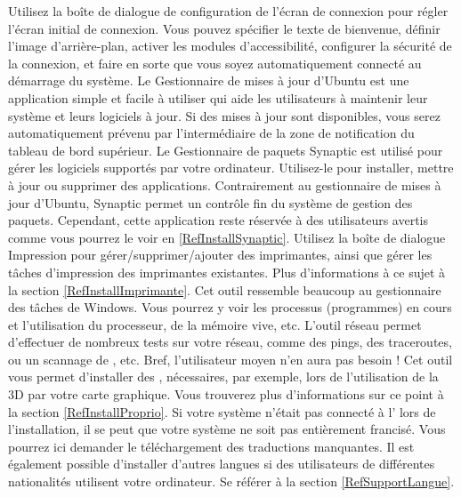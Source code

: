 Utilisez la boîte de dialogue de configuration de l'écran de connexion pour régler l'écran initial de connexion. Vous pouvez spécifier le texte de bienvenue, définir l'image d'arrière-plan, activer les modules d'accessibilité, configurer la sécurité de la connexion, et faire en sorte que vous soyez automatiquement connecté au démarrage du système.
Le Gestionnaire de mises à jour d'Ubuntu est une application simple et facile à utiliser qui aide les utilisateurs à maintenir leur système et leurs logiciels à jour. Si des mises à jour sont disponibles, vous serez automatiquement prévenu par l'intermédiaire de la zone de notification du tableau de bord supérieur.
Le Gestionnaire de paquets Synaptic est utilisé pour gérer les logiciels supportés par votre ordinateur. Utilisez-le pour installer, mettre à jour ou supprimer des applications. Contrairement au gestionnaire de mises à jour d'Ubuntu, Synaptic permet un contrôle fin du système de gestion des paquets. Cependant, cette application reste réservée à des utilisateurs avertis comme vous pourrez le voir en \ref{RefInstallSynaptic}.
Utilisez la boîte de dialogue Impression pour gérer/supprimer/ajouter des imprimantes, ainsi que gérer les tâches d'impression des imprimantes existantes. Plus d'informations à ce sujet à la section \ref{RefInstallImprimante}.
Cet outil ressemble beaucoup au gestionnaire des tâches de Windows. Vous pourrez y voir les processus (programmes) en cours et l'utilisation du processeur, de la mémoire vive, etc.
L'outil réseau permet d'effectuer de nombreux tests sur votre réseau, comme des pings, des traceroutes, ou un scannage de , etc. Bref, l'utilisateur moyen n'en aura pas besoin !
Cet outil vous permet d'installer des  , nécessaires, par exemple, lors de l'utilisation de la 3D par votre carte graphique. Vous trouverez plus d'informations sur ce point à la section \ref{RefInstallProprio}.
Si votre système n'était pas connecté à l' lors de l'installation, il se peut que votre système ne soit pas entièrement francisé. Vous pourrez ici demander le téléchargement des traductions manquantes. Il est également possible d'installer d'autres langues si des utilisateurs de différentes nationalités utilisent votre ordinateur. Se référer à la section \ref{RefSupportLangue}.
